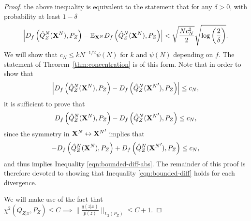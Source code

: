 \begin{proof}
the above inequality is equivalent to the statement that for any $\delta>0$, with probability at least $1-\delta$ 
\begin{align*}
    \left| D_f\left( \hat{Q}_Z^N(\mathbf{X}^N) , P_Z\right) - \mathbb{E}_{\mathbf{X}^N} D_f\left( \hat{Q}_Z^N(\mathbf{X}^N) , P_Z\right) \right| < \sqrt{\frac{Nc_N^2}{2}} \sqrt{\log\left(\frac{2}{\delta}\right)}.
\end{align*}
We will show that $c_N \leq k N^{-1/2} \psi(N)$ for $k$ and $\psi(N)$ depending on $f$.
The statement of Theorem~\ref{thm:concentration} is of this form.
Note that in order to show that
\begin{align}\label{eqn:bounded-diff-abs}
    \left|D_f\left( \hat{Q}_Z^N(\mathbf{X}^N) , P_Z\right) - D_f\left( \hat{Q}_Z^N({\mathbf{X}^N}') , P_Z\right)\right| \leq c_N,
\end{align}
it is sufficient to prove that 
\begin{align}\label{eqn:bounded-diff}
     D_f\left( \hat{Q}_Z^N(\mathbf{X}^N) , P_Z\right) - D_f\left( \hat{Q}_Z^N({\mathbf{X}^N}') , P_Z\right) \leq c_N,
\end{align}
since the symmetry in $\mathbf{X}^N \leftrightarrow {\mathbf{X}^N}'$ implies that
\begin{align}
    - D_f\left( \hat{Q}_Z^N(\mathbf{X}^N) , P_Z\right) + D_f\left( \hat{Q}_Z^N({\mathbf{X}^N}') , P_Z\right) \leq c_N,
\end{align}
and thus implies Inequality \ref{eqn:bounded-diff-abs}.
The remainder of this proof is therefore devoted to showing that Inequality \ref{eqn:bounded-diff} holds for each divergence.

We will make use of the fact that $\chi^2\left(Q_{Z|x} , P_Z\right) \leq C \implies \bigl\| \frac{q(z|x)}{p(z)} \bigr\|_{L_2(P_Z)} \leq C+1. $


\end{proof}
